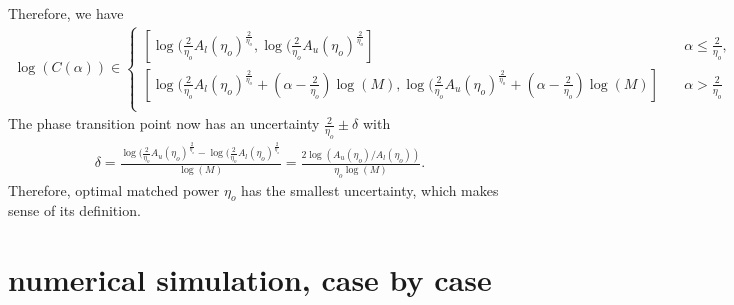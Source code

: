 \documentclass[showpacs,amsmath,amssymb,twocolumn,superscriptaddress,notitlepage,preprintnumbers,aps,pra,10pt,floatfix]{revtex4-2}
\begin{document}
\begin{appendix}
Therefore, we have
\begin{eqnarray}
\log(C(\alpha))\in \begin{cases}
[\log(\frac{2}{\eta_o}A_l(\eta_o)^{\frac{2}{\eta_o}},\log(\frac{2}{\eta_o}A_u(\eta_o)^{\frac{2}{\eta_o}}]& \quad \alpha\leq \frac{2}{\eta_o}, \\
[\log(\frac{2}{\eta_o}A_l(\eta_o)^{\frac{2}{\eta_o}}+(\alpha-\frac{2}{\eta_o})\log(M),\log(\frac{2}{\eta_o}A_u(\eta_o)^{\frac{2}{\eta_o}}+(\alpha-\frac{2}{\eta_o})\log(M)]& \quad \alpha>\frac{2}{\eta_o}\\
\end{cases}
\end{eqnarray}
The phase transition point now has an uncertainty $\frac{2}{\eta_o}\pm \delta $ with
\begin{eqnarray}
\delta =\frac{\log(\frac{2}{\eta_o}A_u(\eta_o)^{\frac{2}{\eta_o}}-\log(\frac{2}{\eta_o}A_l(\eta_o)^{\frac{2}{\eta_o}}}{\log(M)}=\frac{2\log(A_u(\eta_o)/A_l(\eta_o))}{\eta_o\log(M)}.
\end{eqnarray}
Therefore, optimal matched power $\eta_o$ has the smallest uncertainty, which makes sense of its definition.




\end{appendix}

\section{numerical simulation, case by case}
\end{document}
